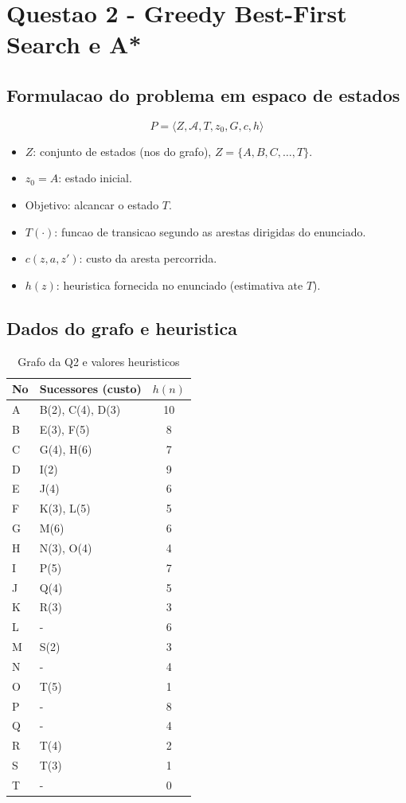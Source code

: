 \section{Questao 2 - Greedy Best-First Search e A*}

\subsection{Formulacao do problema em espaco de estados}
\[
P = \langle Z, \mathcal{A}, T, z_0, G, c, h \rangle
\]
\begin{itemize}[leftmargin=1.5em]
  \item $Z$: conjunto de estados (nos do grafo), $Z=\{A,B,C,\dots,T\}$.
  \item $z_0=A$: estado inicial.
  \item Objetivo: alcancar o estado $T$.
  \item $T(\cdot)$: funcao de transicao segundo as arestas dirigidas do enunciado.
  \item $c(z,a,z')$: custo da aresta percorrida.
  \item $h(z)$: heuristica fornecida no enunciado (estimativa ate $T$).
\end{itemize}

\subsection{Dados do grafo e heuristica}
\begin{table}[H]
\centering
\small
\begin{tabular}{l l c}
\toprule
No & Sucessores (custo) & $h(n)$ \\
\midrule
A & B(2), C(4), D(3) & 10 \\
B & E(3), F(5) & 8 \\
C & G(4), H(6) & 7 \\
D & I(2) & 9 \\
E & J(4) & 6 \\
F & K(3), L(5) & 5 \\
G & M(6) & 6 \\
H & N(3), O(4) & 4 \\
I & P(5) & 7 \\
J & Q(4) & 5 \\
K & R(3) & 3 \\
L & - & 6 \\
M & S(2) & 3 \\
N & - & 4 \\
O & T(5) & 1 \\
P & - & 8 \\
Q & - & 4 \\
R & T(4) & 2 \\
S & T(3) & 1 \\
T & - & 0 \\
\bottomrule
\end{tabular}
\caption{Grafo da Q2 e valores heuristicos}
\end{table}

